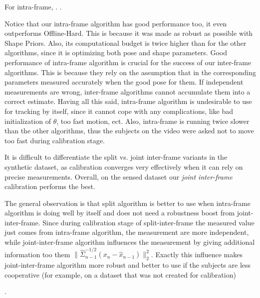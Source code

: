 For intra-frame, .
.
\begin{edit}
Notice that our intra-frame algorithm has good performance too, it even outperforms Offline-Hard. This is because it was made as robust as possible with Shape Priors. Also, its computational budget is twice higher than for the other algorithms, since it is optimizing both pose and shape parameters. Good performance of intra-frame algorithm is crucial for the success of our inter-frame algorithms. This is because they rely on the assumption that in the corresponding parameters measured accurately when the good pose for them. If independent measurements are wrong, inter-frame algorithms cannot accumulate them into a correct estimate. Having all this said, intra-frame algorithm is undesirable to use for tracking by itself, since it cannot cope with any complications, like bad initialization of $\theta$, too fast motion, ect. Also, intra-frame is running twice slower than the other algorithms, thus the subjects on the video were asked not to move too fast during calibration stage.
\end{edit}

It is difficult to differentiate the split vs. joint inter-frame variants in the synthetic dataset, as calibration converges very effectively when it can rely on precise measurements. Overall, on the sensed dataset our \emph{joint inter-frame} calibration performs the best. \begin{edit} The general observation is that split algorithm is better to use when intra-frame algorithm is doing well by itself and does not need a robustness boost from joint-inter-frame. Since during calibration stage of split-inter-frame the measured value just comes from intra-frame algorithm, the measurement are more independent, while joint-inter-frame algorithm influences the measurement by giving additional information too them $\|\hat{\Sigma}_{n-1}^{-1/2} (x_n - \hat{x}_{n-1})\|_2^2$. Exactly this influence makes joint-inter-frame algorithm more robust and better to use if the subjects are less cooperative (for example, on a dataset that was not created for calibration)\end{edit}.

